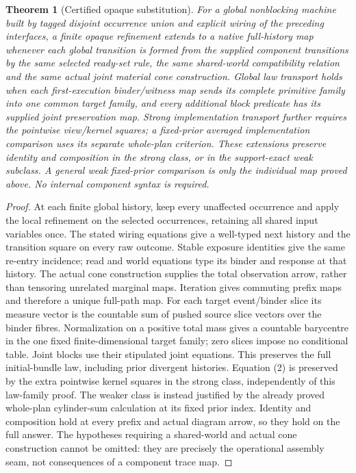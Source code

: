 \documentclass{article}
\newtheorem{theorem}{Theorem}\newtheorem{proposition}{Proposition}
\begin{document}
\begin{theorem}[Certified opaque substitution]
For a global nonblocking machine built by tagged disjoint occurrence union and explicit wiring of the preceding interfaces, a finite opaque refinement extends to a native full-history map whenever each global transition is formed from the supplied component transitions by the same selected ready-set rule, the same shared-world compatibility relation and the same actual joint material cone construction. Global law transport holds when each first-execution binder/witness map sends its complete primitive family into one common target family, and every additional block predicate has its supplied joint preservation map. Strong implementation transport further requires the pointwise view/kernel squares; a fixed-prior averaged implementation comparison uses its separate whole-plan criterion. These extensions preserve identity and composition in the strong class, or in the support-exact weak subclass. A general weak fixed-prior comparison is only the individual map proved above. No internal component syntax is required.
\end{theorem}
\begin{proof}
At each finite global history, keep every unaffected occurrence and apply the local refinement on the selected occurrences, retaining all shared input variables once. The stated wiring equations give a well-typed next history and the transition square on every raw outcome. Stable exposure identities give the same re-entry incidence; read and world equations type its binder and response at that history. The actual cone construction supplies the total observation arrow, rather than tensoring unrelated marginal maps. Iteration gives commuting prefix maps and therefore a unique full-path map. For each target event/binder slice its measure vector is the countable sum of pushed source slice vectors over the binder fibres. Normalization on a positive total mass gives a countable barycentre in the one fixed finite-dimensional target family; zero slices impose no conditional table. Joint blocks use their stipulated joint equations. This preserves the full initial-bundle law, including prior divergent histories. Equation (2) is preserved by the extra pointwise kernel squares in the strong class, independently of this law-family proof. The weaker class is instead justified by the already proved whole-plan cylinder-sum calculation at its fixed prior index. Identity and composition hold at every prefix and actual diagram arrow, so they hold on the full answer. The hypotheses requiring a shared-world and actual cone construction cannot be omitted: they are precisely the operational assembly seam, not consequences of a component trace map.
\end{proof}
\end{document}
